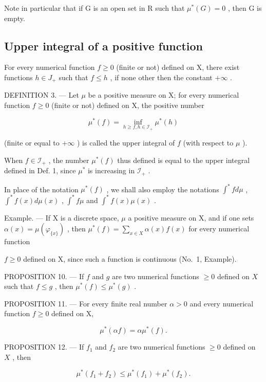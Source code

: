 Note in particular that if G is an open set in R such that \(\mu^{*}(G)=0\) , then G is empty.

\subsection{Upper integral of a positive function}

For every numerical function \(f \geqslant 0\) (finite or not) defined on X, there exist functions \(h \in J_{+}\) such that \(f \leqslant h\) , if none other then the constant \(+\infty\) .

DEFINITION 3. --- Let \(\mu\) be a positive measure on X; for every numerical function \(f \geqslant 0\) (finite or not) defined on X, the positive number

\[
\mu^ {*} (f) = \inf _ {h \geqslant f, h \in \mathscr {I} _ {+}} \mu^ {*} (h)
\]

(finite or equal to \(+\infty\) ) is called the upper integral of \(f\) (with respect to \(\mu\) ).

When \(f \in \mathcal{I}_+\) , the number \(\mu^*(f)\) thus defined is equal to the upper integral defined in Def. 1, since \(\mu^*\) is increasing in \(\mathcal{I}_+\) .

In place of the notation \(\mu^{*}(f)\) , we shall also employ the notations \(\int^{*} f d\mu\) , \(\int^{*} f(x) d\mu(x)\) , \(\int^{*} f\mu\) and \(\int^{*} f(x)\mu(x)\) .

Example. --- If X is a discrete space, \(\mu\) a positive measure on X, and if one sets \(\alpha(x) = \mu(\varphi_{\{x\}})\) , then \(\mu^{*}(f) = \sum_{x \in X} \alpha(x)f(x)\) for every numerical function

\(f \geqslant 0\) defined on X, since such a function is continuous (No.~1, Example).

PROPOSITION 10. --- If \(f\) and \(g\) are two numerical functions \(\geqslant 0\) defined on \(X\) such that \(f \leqslant g\) , then \(\mu^{*}(f) \leqslant \mu^{*}(g)\) .

PROPOSITION 11. --- For every finite real number \(\alpha > 0\) and every numerical function \(f \geqslant 0\) defined on X,

\[
\mu^ {*} (\alpha f) = \alpha \mu^ {*} (f).\tag{8}
\]

PROPOSITION 12. --- If \(f_1\) and \(f_2\) are two numerical functions \(\geqslant 0\) defined on \(X\) , then

\[
\mu^ {*} (f _ {1} + f _ {2}) \leqslant \mu^ {*} (f _ {1}) + \mu^ {*} (f _ {2}).\tag{9}
\]

